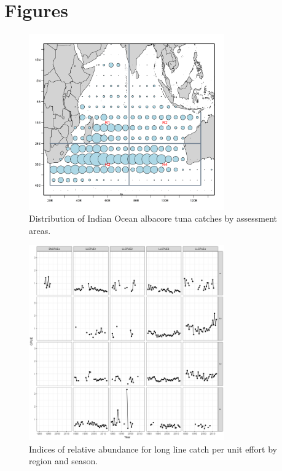 \newpage
\section*{Figures}

\begin{figure}[ht!]\centering\includegraphics[width=0.75\textwidth]{figures/alb-map.png} 
\caption{Distribution of Indian Ocean albacore tuna catches by assessment areas.}
\label{fig:map}
\end{figure}


\begin{figure}
        \centering\includegraphics[width=0.75\textwidth]{figures/cpue.png}
        \caption{Indices of relative abundance for long line catch per unit effort by region and season.}
        \label{fig:u}
\end{figure}

